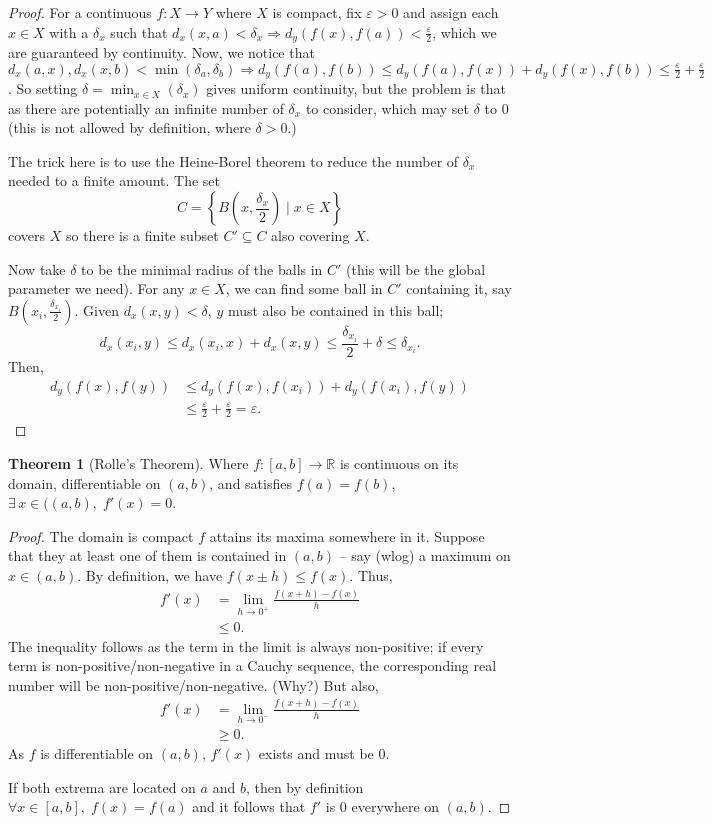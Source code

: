 \documentclass{article}
\theoremstyle{definition}
\newtheorem{thm}{Theorem}[subsubsection]
\begin{document}
\begin{proof}
	For a continuous $f:X\rightarrow Y$ where $X$ is compact, fix $\varepsilon>0$ and assign each $x\in X$ with a $\delta_x$ such that $d_x(x,a)<\delta_x\Rightarrow d_y(f(x),f(a))<\frac{\varepsilon}{2}$, which we are guaranteed by continuity. Now, we notice that $d_x(a,x),d_x(x,b)<\min(\delta_a,\delta_b)\Rightarrow d_y(f(a),f(b))\leq d_y(f(a),f(x))+d_y(f(x),f(b))\leq\frac{\varepsilon}{2}+\frac{\varepsilon}{2}$. So setting $\delta=\min_{x\in X}(\delta_x)$ gives uniform continuity, but the problem is that as there are potentially an infinite number of $\delta_x$ to consider, which may set $\delta$ to 0 (this is not allowed by definition, where $\delta>0$.)\par
	
	The trick here is to use the Heine-Borel theorem to reduce the number of $\delta_x$ needed to a finite amount. The set \[C=\left\{B\left(x,\frac{\delta_x}{2}\right)\mid x\in X\right\}\] covers $X$ so there is a finite subset $C'\subseteq C$ also covering $X$.

	Now take $\delta$ to be the minimal radius of the balls in $C'$ (this will be the global parameter we need). For any $x\in X$, we can find some ball in $C'$ containing it, say $B(x_i,\frac{\delta_{x_i}}{2})$. Given $d_x(x,y)<\delta$, $y$ must also be contained in this ball; \[d_x(x_i,y)\leq d_x(x_i,x)+d_x(x,y)\leq\frac{\delta_{x_i}}{2}+\delta\leq\delta_{x_i}.\]
	Then,
	\begin{align*}
		d_y(f(x),f(y))&\leq d_y(f(x),f(x_i))+d_y(f(x_i),f(y))\\
		&\leq\frac{\varepsilon}{2}+\frac{\varepsilon}{2}=\varepsilon.
	\end{align*}
\end{proof}
\begin{thm}[Rolle's Theorem]
	Where $f:[a,b]\rightarrow \mathbb{R}$ is continuous on its domain, differentiable on $(a,b)$, and satisfies $f(a)=f(b)$, $\exists\,x\in ((a,b),\;f'(x)=0$.
\end{thm}
\begin{proof}
	The domain is compact $f$ attains its maxima somewhere in it.
	Suppose that they at least one of them is contained in $(a,b)$ -- say (wlog) a maximum on $x\in(a,b)$. By definition, we have $f(x\pm h)\leq f(x)$. Thus, 
	\begin{align*}
		f'(x)&=\lim\limits_{h\rightarrow0^+}\frac{f(x+h)-f(x)}{h}\\
		&\leq0.
	\end{align*}
	The inequality follows as the term in the limit is always non-positive; if every term is non-positive/non-negative in a Cauchy sequence, the corresponding real number will be non-positive/non-negative. (Why?)
	But also,
	\begin{align*}
		f'(x)&=\lim\limits_{h\rightarrow0^-}\frac{f(x+h)-f(x)}{h}\\
		&\geq0.
	\end{align*}
	As $f$ is differentiable on $(a,b)$, $f'(x)$ exists and must be 0.\par
	If both extrema are located on $a$ and $b$, then by definition $\forall x\in[a,b],\;f(x)=f(a)$ and it follows that $f'$ is 0 everywhere on $(a,b)$.
\end{proof}
\end{document}
